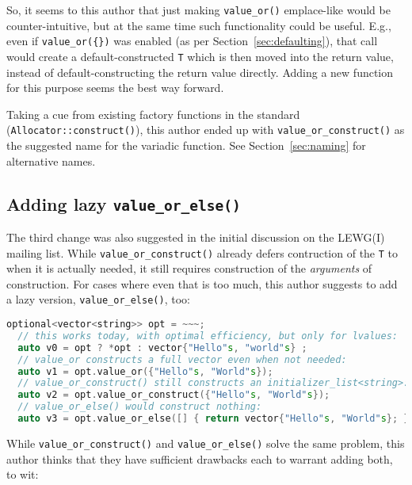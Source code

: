 \documentclass[11pt]{article}
\begin{document}
So, it seems to this author that just making \texttt{value\_or()}
emplace-like would be counter-intuitive, but at the same time such
functionality could be useful. E.g., even if \texttt{value\_or(\{\})}
was enabled (as per Section~\ref{sec:defaulting}), that call would
create a default-constructed \texttt{T} which is then moved into the
return value, instead of default-constructing the return value
directly. Adding a new function for this purpose seems the best way
forward.

Taking a cue from existing factory functions in the standard
(\texttt{Allocator::construct()}), this author ended up with
\texttt{value\_or\_construct()} as the suggested name for the variadic
function. See Section~\ref{sec:naming} for alternative names.

\subsection{Adding lazy \texttt{value\_or\_else()}}
\label{sec:value_or_else}

The third change was also suggested in the initial discussion on the
LEWG(I) mailing list. While \texttt{value\_or\_construct()} already
defers contruction of the \texttt{T} to when it is actually needed, it
still requires construction of the \emph{arguments} of
construction. For cases where even that is too much, this author
suggests to add a lazy version, \texttt{value\_or\_else()}, too:

\begin{lstlisting}[language=c++]
  optional<vector<string>> opt = ~~~;
  // this works today, with optimal efficiency, but only for lvalues:
  auto v0 = opt ? *opt : vector{"Hello"s, "world"s} ;
  // value_or constructs a full vector even when not needed:
  auto v1 = opt.value_or({"Hello"s, "World"s});
  // value_or_construct() still constructs an initializer_list<string>:
  auto v2 = opt.value_or_construct({"Hello"s, "World"s});
  // value_or_else() would construct nothing:
  auto v3 = opt.value_or_else([] { return vector{"Hello"s, "World"s}; });
\end{lstlisting}

While \texttt{value\_or\_construct()} and \texttt{value\_or\_else()}
solve the same problem, this author thinks that they have sufficient
drawbacks each to warrant adding both, to wit:
\end{document}
